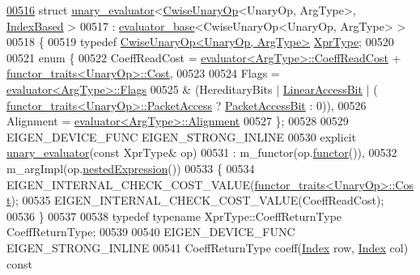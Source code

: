 \begin{DoxyCode}
\hyperlink{struct_eigen_1_1internal_1_1unary__evaluator_3_01_cwise_unary_op_3_01_unary_op_00_01_arg_type_01_4_00_01_index_based_01_4}{00516} \textcolor{keyword}{struct }\hyperlink{struct_eigen_1_1internal_1_1unary__evaluator}{unary\_evaluator}<\hyperlink{group___core___module_class_eigen_1_1_cwise_unary_op}{CwiseUnaryOp}<UnaryOp, ArgType>, 
      \hyperlink{struct_eigen_1_1internal_1_1_index_based}{IndexBased} >
00517   : \hyperlink{struct_eigen_1_1internal_1_1evaluator__base}{evaluator\_base}<CwiseUnaryOp<UnaryOp, ArgType> >
00518 \{
00519   \textcolor{keyword}{typedef} \hyperlink{group___core___module_class_eigen_1_1_cwise_unary_op}{CwiseUnaryOp<UnaryOp, ArgType>} \hyperlink{group___core___module_class_eigen_1_1_cwise_unary_op}{XprType};
00520   
00521   \textcolor{keyword}{enum} \{
00522     CoeffReadCost = \hyperlink{struct_eigen_1_1internal_1_1evaluator}{evaluator<ArgType>::CoeffReadCost} + 
      \hyperlink{struct_eigen_1_1internal_1_1functor__traits}{functor\_traits<UnaryOp>::Cost},
00523     
00524     Flags = \hyperlink{struct_eigen_1_1internal_1_1evaluator}{evaluator<ArgType>::Flags}
00525           & (HereditaryBits | \hyperlink{group__flags_ga4b983a15d57cd55806df618ac544d09e}{LinearAccessBit} | (
      \hyperlink{struct_eigen_1_1internal_1_1functor__traits}{functor\_traits<UnaryOp>::PacketAccess} ? 
      \hyperlink{group__flags_ga1a306a438e1ab074e8be59512e887b9f}{PacketAccessBit} : 0)),
00526     Alignment = \hyperlink{struct_eigen_1_1internal_1_1evaluator}{evaluator<ArgType>::Alignment}
00527   \};
00528 
00529   EIGEN\_DEVICE\_FUNC EIGEN\_STRONG\_INLINE
00530   \textcolor{keyword}{explicit} \hyperlink{struct_eigen_1_1internal_1_1unary__evaluator}{unary\_evaluator}(\textcolor{keyword}{const} XprType& op)
00531     : m\_functor(op.\hyperlink{group___core___module_ac02eff03893317021760f7d093c4ab9d}{functor}()), 
00532       m\_argImpl(op.\hyperlink{group___core___module_a25d4402be360cf0b8ff867863da46c7d}{nestedExpression}()) 
00533   \{
00534     EIGEN\_INTERNAL\_CHECK\_COST\_VALUE(\hyperlink{struct_eigen_1_1internal_1_1functor__traits}{functor\_traits<UnaryOp>::Cost});
00535     EIGEN\_INTERNAL\_CHECK\_COST\_VALUE(CoeffReadCost);
00536   \}
00537 
00538   \textcolor{keyword}{typedef} \textcolor{keyword}{typename} XprType::CoeffReturnType CoeffReturnType;
00539 
00540   EIGEN\_DEVICE\_FUNC EIGEN\_STRONG\_INLINE
00541   CoeffReturnType coeff(\hyperlink{namespace_eigen_a62e77e0933482dafde8fe197d9a2cfde}{Index} row, \hyperlink{namespace_eigen_a62e77e0933482dafde8fe197d9a2cfde}{Index} col)\textcolor{keyword}{ const}

\end{DoxyCode}
